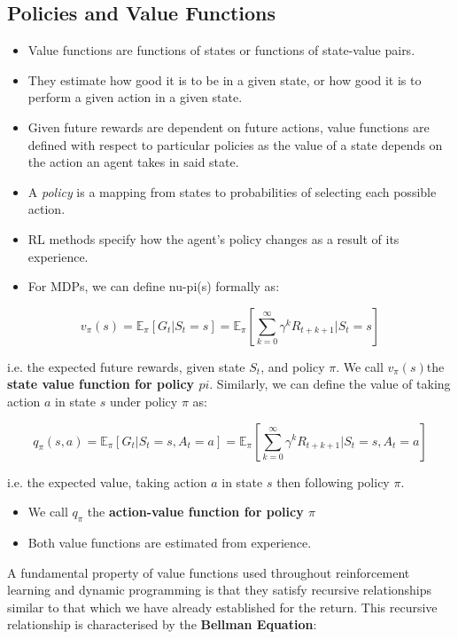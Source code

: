 \subsection{Policies and Value Functions}
\begin{itemize}
\item Value functions are functions of states or functions of state-value pairs.
\item They estimate how good it is to be in a given state, or how good it is to perform a given action in a given state.
\item Given future rewards are dependent on future actions, value functions are defined with respect to particular policies as the value of a state depends on the action an agent takes in said state.
\item A \textit{policy} is a mapping from states to probabilities of selecting each possible action.
\item RL methods specify how the agent's policy changes as a result of its experience.
\item For MDPs, we can define nu-pi(s) formally as:
\end{itemize}

\begin{equation}
v_\pi(s) = \mathbb{E}_\pi \left[G_t | S_t = s \right] = \mathbb{E}_\pi \left[\sum_{k=0}^{\infty} \gamma^k R_{t+k+1} | S_t = s\right]
\end{equation}

i.e. the expected future rewards, given state \(S_t\), and policy \(\pi\). We call \(v_\pi(s)\)the \textbf{state value function for policy \(pi\)}. Similarly, we can define the value of taking action \(a\) in state \(s\) under policy \(\pi\) as:

\begin{equation}
q_\pi(s,a) = \mathbb{E}_\pi \left[G_t | S_t = s, A_t = a \right] = \mathbb{E}_\pi \left[\sum_{k=0}^{\infty} \gamma^k R_{t+k+1} | S_t = s, A_t = a \right]
\end{equation}

i.e. the expected value, taking action \(a\) in state \(s\) then following policy \(\pi\).
\begin{itemize}
\item We call \(q_\pi\) the \textbf{action-value function for policy \(\pi\)}
\item Both value functions are estimated from experience.
\end{itemize}

A fundamental property of value functions used throughout reinforcement learning and dynamic programming is that they satisfy recursive relationships similar to that which we have already established for the return. This recursive relationship is characterised by the \textbf{Bellman Equation}:

